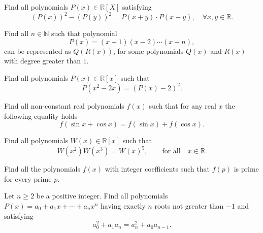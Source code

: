 \begin{question}
Find all polynomials $ P(x) \in \mathbb{R}[X]$ satisfying 
\[ (P(x))^2-(P(y))^2=P(x+y)\cdot P(x-y) ,\quad  \forall x,y \in \mathbb R.\]
\end{question}





\begin{question}
Find all $ n\in\mathbb{N}$ such that polynomial
\[ P(x) = (x - 1)(x - 2) \cdots (x -n),\]
can be represented as $Q(R(x))$, for some polynomials $Q(x)$ and $R(x)$ with degree greater than $1$.
\end{question}





\begin{question}
Find all polynomials $ P(x) \in \mathbb R[x]$ such that
\[P(x^2-2x)=\left( P(x)-2 \right)^2.\]
\end{question}





\begin{question}
Find all non-constant real polynomials $f(x)$ such that for any real $x$ the following equality holds
\[ f(\sin x +\cos x) = f(\sin x) + f(\cos x).\]
\end{question}





\begin{question}
Find all polynomials $ W(x)\in \mathbb R[x]$ such that
\[W(x^2)W(x^3)=W(x)^5, \qquad \text{for all} \quad x \in \mathbb R.\]
\end{question}





\begin{question}
Find all the polynomials $f(x)$ with integer coefficients such that $f(p)$ is prime for every prime $p.$
\end{question}





\begin{question}
Let $ n \geq 2$ be a positive integer. Find all polynomials $ P(x)=a_0 +a_1 x +\cdots + a_{n} x^n$ having exactly $ n$ roots not greater than $-1$ and satisfying
\[ a^2_0+ a_1 a_n = a^2_n +a_0 a_{n-1}.\]
\end{question}





